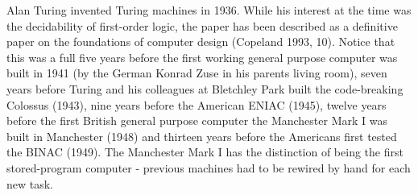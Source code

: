 \documentclass[../../../include/open-logic-section]{subfiles}
\begin{document}


Alan Turing invented Turing machines in 1936. While his interest at the
time was the decidability of first-order logic, the paper has been
described as a definitive paper on the foundations of computer design
(Copeland 1993, 10). Notice that this was a full five years before the
first working general purpose computer was built in 1941 (by the German
Konrad Zuse in his parents living room), seven years before Turing and his
colleagues at Bletchley Park built the code-breaking Colossus (1943), nine
years before the American ENIAC (1945), twelve years before the first
British general purpose computer the Manchester Mark I was built in
Manchester (1948) and thirteen years before the Americans first tested the
BINAC (1949). The Manchester Mark I has the distinction of being the first
stored-program computer - previous machines had to be rewired by hand for
each new task.
\end{document}
